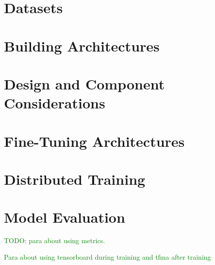\section{Datasets}






\section{Building Architectures}








\section{Design and Component Considerations}














\section{Fine-Tuning Architectures}





\section{Distributed Training}


\section{Model Evaluation}

\textcolor{green}{TODO: para about using metrics.}

\textcolor{green}{Para about using tensorboard during training and tfma after training}


